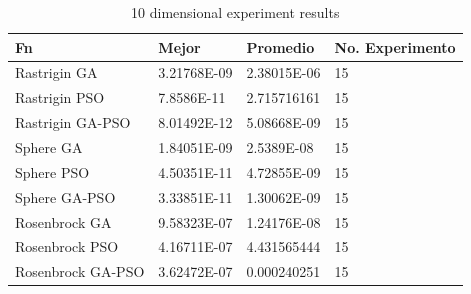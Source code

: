 \documentclass[runningheads]{llncs}
\begin{document}
        \begin{table}[htp]
          \caption{10 dimensional experiment results}
          \label{table:resultados-2}
          \centering
          \begin{tabular}{|l|l|l|l|}
          \hline
          Fn & Mejor & Promedio & No. Experimento \\
          \hline
          \hline
          Rastrigin GA & 3.21768E-09 & 2.38015E-06 & 15\\
          \hline
          Rastrigin PSO & 7.8586E-11 & 2.715716161 & 15\\
          \hline
          Rastrigin GA-PSO & 8.01492E-12 & 5.08668E-09 & 15\\
          \hline
          Sphere GA & 1.84051E-09 & 2.5389E-08 & 15\\
          \hline
          Sphere PSO & 4.50351E-11 & 4.72855E-09 & 15\\
          \hline
          Sphere GA-PSO & 3.33851E-11 & 1.30062E-09 & 15\\
          \hline
          Rosenbrock GA & 9.58323E-07 & 1.24176E-08 & 15\\
          \hline
          Rosenbrock PSO & 4.16711E-07 & 4.431565444 & 15\\
          \hline
          Rosenbrock GA-PSO & 3.62472E-07 & 0.000240251 & 15\\
          \hline
          \end{tabular}
          \end{table}
\end{document}
